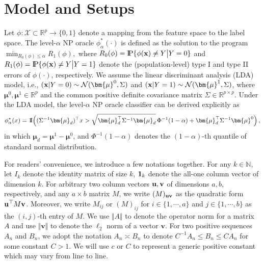 \documentclass[12pt]{article}
\numberwithin{equation}{section}
\theoremstyle{remark}
\newcommand{\p}{{\rm I}\kern-0.18em{\rm P}}
\newcommand{\1}{{\rm 1}\kern-0.24em{\rm I}}
\begin{document}
\vspace{-0.2in}
\section{Model and Setups}\label{sec:models and set up}
\vspace{-0.1in}

Let $\phi: \mathcal{X}\subset\mathbb{R}^p \to \{0,1\}$ denote a mapping from the feature space to the label space. The level-$\alpha$ NP oracle $\phi_\alpha^*(\cdot)$ is defined as the solution to the program
$
\min_{R_0(\phi)\leq \alpha} R_1(\phi),
$
where  $R_0(\phi)= \p \{ \phi({\bf x})\neq Y \big| Y=0\}$ and $R_1(\phi)= \p \{ \phi({\bf x})\neq Y \big| Y=1\}$ denote the (population-level) type I and type II errors of $\phi(\cdot)$, respectively.
We assume the linear discriminant analysis (LDA) model, i.e., $({\bf x}|Y=0)\sim \mathcal{N} ({\bm{\mu}}^0, \Sigma)$ and $({\bf x}|Y=1)\sim \mathcal{N} ({\bm{\mu}}^1, \Sigma)$,  where ${\bm{\mu}}^0, {\bm{\mu}}^1\in \mathbb{R}^{p}$ and the common positive definite covariance matrix $\Sigma \in \mathbb{R}^{p\times p}$.  Under the LDA model, the level-$\alpha$ NP oracle classifier can be derived explicitly as 
\begin{align}\label{def:class_NP}
\phi_\alpha^*(x)= \1 \Big( (\Sigma^{-1}{\bm{\mu}}_d)^{\top}  x > \sqrt{{\bm{\mu}}_d^{\top} \Sigma^{-1}{\bm{\mu}}_d} \, \Phi^{-1}(1-\alpha) + {\bm{\mu}}_d^{\top} \Sigma^{-1} {\bm{\mu}}^0\Big)\,,
\end{align}
in which ${\bm{\mu}}_d={\bm{\mu}}^1-{\bm{\mu}}^0$, and $\Phi^{-1}(1-\alpha)$ denotes the $(1-\alpha)$-th quantile of standard normal distribution.


For readers' convenience, we introduce a few notations together. For any $k\in \mathbb{N}$, let  $I_k$ denote  the identity matrix  of size $k$, ${\bf{1}}_{k}$ denote the  all-one column vector of dimension $k$. For arbitrary two column vectors ${\bf u}, {\bf v}$ of dimensions $a, b$, respectively, and any $a\times b$ matrix $M$, we write $(M)_{{\bf u} {\bf v}}$ as the quadratic form ${\bf u}^{\top} M {\bf v}$. Moreover, we write $M_{ij}$ or $(M)_{ij}$ for $i\in\{ 1,\cdots, a\}$ and $j\in \{ 1,\cdots, b\}$ as the $(i,j)$-th entry of $M$. We use $\Vert A \Vert $ to denote the operator norm for a matrix $A$ and use $\Vert \mathbf{v} \Vert $  to denote the $\ell_2$ norm of a  vector $\mathbf{v}$. For two positive sequences $A_n$ and $B_n$, we adopt the notation $A_n\asymp B_n$ to denote $C^{-1}A_n\leq B_n \leq C A_n$ for some constant $C>1$.
 We will use $c$ or $C$ to represent a generic positive constant which may vary from line to line. 
 
\end{document}
